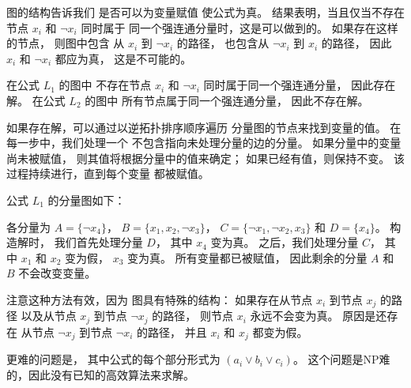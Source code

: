 图的结构告诉我们
是否可以为变量赋值
使公式为真。
结果表明，当且仅当不存在
节点 $x_i$ 和 $\lnot x_i$ 同时属于
同一个强连通分量时，这是可以做到的。
如果存在这样的节点，
则图中包含
从 $x_i$ 到 $\lnot x_i$ 的路径，
也包含从 $\lnot x_i$ 到 $x_i$ 的路径，
因此 $x_i$ 和 $\lnot x_i$ 都应为真，
这是不可能的。

在公式 $L_1$ 的图中
不存在节点 $x_i$ 和 $\lnot x_i$
同时属于同一个强连通分量，
因此存在解。
在公式 $L_2$ 的图中
所有节点属于同一个强连通分量，
因此不存在解。

如果存在解，可以通过以逆拓扑排序顺序遍历
分量图的节点来找到变量的值。
在每一步中，我们处理一个
不包含指向未处理分量的边的分量。
如果分量中的变量
尚未被赋值，
则其值将根据分量中的值来确定；
如果已经有值，则保持不变。
该过程持续进行，直到每个变量
都被赋值。

公式 $L_1$ 的分量图如下：
\begin{center}
\end{center}

各分量为
$A = \{\lnot x_4\}$，
$B = \{x_1, x_2, \lnot x_3\}$，
$C = \{\lnot x_1, \lnot x_2, x_3\}$ 和
$D = \{x_4\}$。
构造解时，
我们首先处理分量 $D$，
其中 $x_4$ 变为真。
之后，我们处理分量 $C$，
其中 $x_1$ 和 $x_2$ 变为假，
$x_3$ 变为真。
所有变量都已被赋值，
因此剩余的分量 $A$ 和 $B$
不会改变变量。

注意这种方法有效，因为
图具有特殊的结构：
如果存在从节点 $x_i$ 到节点 $x_j$ 的路径
以及从节点 $x_j$ 到节点 $\lnot x_j$ 的路径，
则节点 $x_i$ 永远不会变为真。
原因是还存在
从节点 $\lnot x_j$ 到节点 $\lnot x_i$ 的路径，
并且 $x_i$ 和 $x_j$ 都变为假。


更难的问题是，
其中公式的每个部分形式为
$(a_i \lor b_i \lor c_i)$。
这个问题是NP难的，因此没有已知的高效算法来求解。
